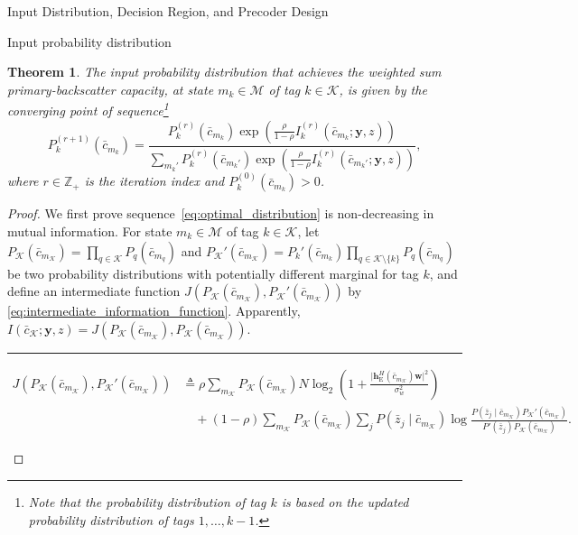 \documentclass[journal]{IEEEtran}
\newtheorem{theorem}{Theorem}
\begin{document}
\begin{section}{Input Distribution, Decision Region, and Precoder Design}
\begin{subsection}{Input probability distribution}
			\begin{theorem}
				The input probability distribution that achieves the weighted sum primary-backscatter capacity, at state $m_k \in \mathcal{M}$ of tag $k \in \mathcal{K}$, is given by the converging point of sequence\footnote{Note that the probability distribution of tag $k$ is based on the updated probability distribution of tags $1,\ldots,k-1$.}
				\begin{equation}
					P_k^{(r+1)}(\bar{c}_{m_k}) = \frac{P_k^{(r)}(\bar{c}_{m_k}) \exp \left( \frac{\rho}{1 - \rho} I_k^{(r)}(\bar{c}_{m_k};\boldsymbol{y},z) \right)}{\sum_{m_k'} P_k^{(r)}(\bar{c}_{m_k'}) \exp \left( \frac{\rho}{1 - \rho} I_k^{(r)}(\bar{c}_{m_k'};\boldsymbol{y},z) \right)},
					\label{eq:optimal_distribution}
				\end{equation}
				where $r \in \mathbb{Z}_+$ is the iteration index and $P_k^{(0)}(\bar{c}_{m_k}) > 0$.
				\label{th:optimal_distribution}
			\end{theorem}
			\begin{proof}
				We first prove sequence~\eqref{eq:optimal_distribution} is non-decreasing in mutual information. For state $m_k \in \mathcal{M}$ of tag $k \in \mathcal{K}$, let $P_{\mathcal{K}}(\bar{c}_{m_{\mathcal{K}}}) = \prod_{q \in \mathcal{K}} P_q(\bar{c}_{m_q})$ and $P_{\mathcal{K}}'(\bar{c}_{m_{\mathcal{K}}}) = P_k'(\bar{c}_{m_k}) \prod_{q \in \mathcal{K} \setminus \{k\}} P_q(\bar{c}_{m_q})$ be two probability distributions with potentially different marginal for tag $k$, and define an intermediate function $J \left( P_{\mathcal{K}}(\bar{c}_{m_{\mathcal{K}}}),P_{\mathcal{K}}'(\bar{c}_{m_{\mathcal{K}}}) \right)$ by \eqref{eq:intermediate_information_function}. Apparently, $I(\bar{c}_{\mathcal{K}};\boldsymbol{y},z) = J \left( P_{\mathcal{K}}(\bar{c}_{m_{\mathcal{K}}}),P_{\mathcal{K}}(\bar{c}_{m_{\mathcal{K}}}) \right)$.
				\begin{figure*}[!b]
					\hrule
					\begin{align}
						J \left( P_{\mathcal{K}}(\bar{c}_{m_{\mathcal{K}}}),P_{\mathcal{K}}'(\bar{c}_{m_{\mathcal{K}}}) \right)
						& \triangleq \rho \sum_{m_{\mathcal{K}}} P_{\mathcal{K}}(\bar{c}_{m_{\mathcal{K}}}) N \log_2 \left(1 + \frac{\lvert \boldsymbol{h}_{\mathrm{E}}^H(\bar{c}_{m_{\mathcal{K}}}) \boldsymbol{w} \rvert^2}{\sigma_w^2}\right)\nonumber\\
						& \quad + (1 - \rho) \sum_{m_{\mathcal{K}}} P_{\mathcal{K}}(\bar{c}_{m_{\mathcal{K}}}) \sum_j P(\bar{z}_j \mid \bar{c}_{m_{\mathcal{K}}}) \log \frac{P(\bar{z}_j \mid \bar{c}_{m_{\mathcal{K}}}) P_{\mathcal{K}}'(\bar{c}_{m_{\mathcal{K}}})}{P'(\bar{z}_j) P_{\mathcal{K}}(\bar{c}_{m_{\mathcal{K}}})}.

\end{align}
\end{figure*}
\end{proof}
\end{subsection}
\end{section}
\end{document}
